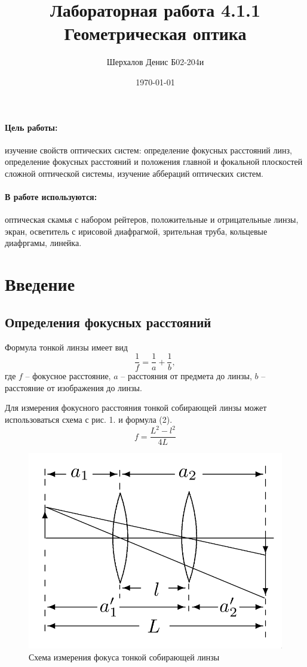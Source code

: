\documentclass[a4paper,12pt]{article}
\author{Шерхалов Денис Б02-204и}
\title{Лабораторная работа 4.1.1 \\
	\textbf{Геометрическая оптика}}
\date{\today}
\theoremstyle{definition}
\begin{document}
	
{\Large \maketitle}

	\paragraph*{Цель работы:} изучение свойств оптических систем: определение фокусных расстояний линз, определение фокусных расстояний и положения главной и фокальной плоскостей сложной оптической системы, изучение аббераций оптических систем.

	\paragraph*{В работе используются:} оптическая скамья с набором рейтеров, положительные и отрицательные линзы, экран, осветитель с ирисовой диафрагмой, зрительная труба, кольцевые диафргамы, линейка.

\section{Введение}
\subsection*{Определения фокусных расстояний}
Формула тонкой линзы имеет вид
\begin{equation}
    \frac{1}{f} = \frac{1}{a} + \frac{1}{b},
\end{equation}
\noindent
где $f$ -- фокусное расстояние, $a$ -- расстояния от предмета до линзы, $b$ -- расстояние от изображения до линзы.

\noindent
Для измерения фокусного расстояния тонкой собирающей линзы может использоваться схема с рис. 1. и формула (2).
\begin{equation}
    f = \frac{L^2 - l^2}{4L}
\end{equation}

\begin{figure}[H]
    \centering
    \includegraphics[scale=0.3]{pic_1.png}
    \caption{Схема измерения фокуса тонкой собирающей линзы}
\end{figure}
\end{document}

